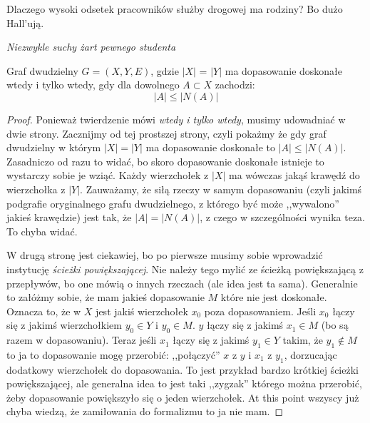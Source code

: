   \epigraph{Dlaczego wysoki odsetek pracowników służby drogowej ma rodziny? Bo dużo Hall'ują.}{\textit{Niezwykle suchy żart pewnego studenta}}
  \begin{theorem}[Halla]
      Graf dwudzielny $G = (X,Y,E)$, gdzie $|X|$ = $|Y|$ ma dopasowanie doskonałe wtedy i tylko wtedy, gdy dla dowolnego $A \subset X$ zachodzi: \begin{equation}
          |A| \leq |N(A)|
      \end{equation}
  \end{theorem}

  \begin{proof}
      Ponieważ twierdzenie mówi \textit{wtedy i tylko wtedy}, musimy udowadniać w dwie strony. Zacznijmy od tej prostszej strony, czyli pokażmy że gdy graf dwudzielny w którym $|X| = |Y|$ ma dopasowanie doskonałe to $|A| \leq |N(A)|$. Zasadniczo od razu to widać, bo skoro dopasowanie doskonałe istnieje to wystarczy sobie je wziąć. Każdy wierzchołek z $|X|$ ma wówczas jakąś krawędź do wierzchołka z $|Y|$. Zauważamy, że siłą rzeczy w samym dopasowaniu (czyli jakimś podgrafie oryginalnego grafu dwudzielnego, z którego być może ,,wywalono'' jakieś krawędzie) jest tak, że $|A| = |N(A)|$, z czego w szczególności wynika teza. To chyba widać. 

      W drugą stronę jest ciekawiej, bo po pierwsze musimy sobie wprowadzić instytucję \textit{ścieżki powiększającej}. Nie należy tego mylić ze ścieżką powiększającą z przepływów, bo one mówią o innych rzeczach (ale idea jest ta sama). Generalnie to załóżmy sobie, że mam jakieś dopasowanie $M$ które nie jest doskonałe. Oznacza to, że w $X$ jest jakiś wierzchołek $x_0$ poza dopasowaniem. Jeśli $x_0$ łączy się z jakimś wierzchołkiem $y_0 \in Y$ i $y_0 \in M$. $y$ łączy się z jakimś $x_1 \in M$ (bo są razem w dopasowaniu). Teraz jeśli $x_1$ łączy się z jakimś $y_1 \in Y$ takim, że $y_1 \not \in M$ to ja to dopasowanie mogę przerobić: ,,połączyć'' $x$ z $y$ i $x_1$ z $y_1$, dorzucając dodatkowy wierzchołek do dopasowania. To jest przykład bardzo krótkiej ścieżki powiększającej, ale generalna idea to jest taki ,,zygzak'' którego można przerobić, żeby dopasowanie powiększyło się o jeden wierzchołek. At this point wszyscy już chyba wiedzą, że zamiłowania do formalizmu to ja nie mam. 
      

\end{proof}
